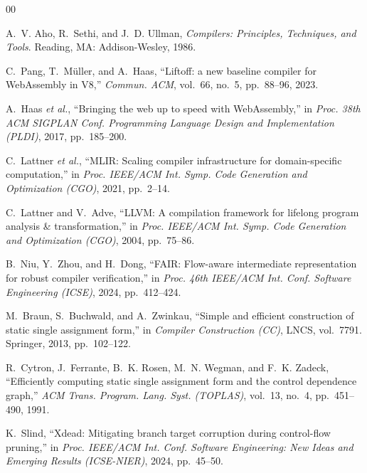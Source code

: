 \documentclass[conference]{IEEEtran}
\begin{document}
\begin{thebibliography}{00}
\footnotesize
\setlength{\itemsep}{0pt plus 0.1pt}
\setlength{\parskip}{0pt}

A.~V. Aho, R.~Sethi, and J.~D. Ullman,
\textit{Compilers: Principles, Techniques, and Tools}.
\newblock Reading, MA: Addison-Wesley, 1986.

C.~Pang, T.~M\"uller, and A.~Haas,
``Liftoff: a new baseline compiler for WebAssembly in V8,''
\textit{Commun. ACM}, vol.~66, no.~5, pp.~88--96, 2023.

A.~Haas \textit{et al.},
``Bringing the web up to speed with WebAssembly,''
in \textit{Proc. 38th ACM SIGPLAN Conf. Programming Language Design and Implementation (PLDI)},
2017, pp.~185--200.

C.~Lattner \textit{et al.},
``MLIR: Scaling compiler infrastructure for domain-specific computation,''
in \textit{Proc. IEEE/ACM Int. Symp. Code Generation and Optimization (CGO)},
2021, pp.~2--14.

C.~Lattner and V.~Adve,
``LLVM: A compilation framework for lifelong program analysis \& transformation,''
in \textit{Proc. IEEE/ACM Int. Symp. Code Generation and Optimization (CGO)},
2004, pp.~75--86.

B.~Niu, Y.~Zhou, and H.~Dong,
``FAIR: Flow-aware intermediate representation for robust compiler verification,''
in \textit{Proc. 46th IEEE/ACM Int. Conf. Software Engineering (ICSE)},
2024, pp.~412--424.

M.~Braun, S.~Buchwald, and A.~Zwinkau,
``Simple and efficient construction of static single assignment form,''
in \textit{Compiler Construction (CC)}, LNCS, vol.~7791.
\newblock Springer, 2013, pp.~102--122.

R.~Cytron, J.~Ferrante, B.~K. Rosen, M.~N. Wegman, and F.~K. Zadeck,
``Efficiently computing static single assignment form and the control dependence graph,''
\textit{ACM Trans. Program. Lang. Syst. (TOPLAS)}, vol.~13, no.~4, pp.~451--490, 1991.

K.~Slind,
``Xdead: Mitigating branch target corruption during control-flow pruning,''
in \textit{Proc. IEEE/ACM Int. Conf. Software Engineering: New Ideas and Emerging Results (ICSE-NIER)},
2024, pp.~45--50.


\end{thebibliography}
\end{document}
